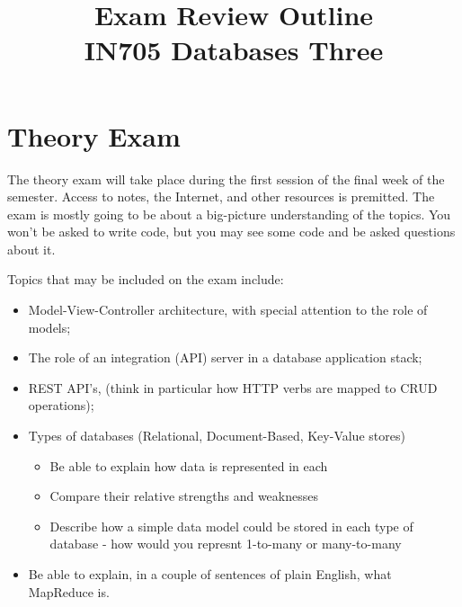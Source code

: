 \documentclass{article}
\begin{document}
\title{Exam Review Outline\\ IN705 Databases Three}
\date{}
\maketitle

\section*{Theory Exam}
The theory exam will take place during the first session of the final week of the semester. Access to notes, the Internet, and other resources is premitted. 
The exam is mostly going to be about a big-picture understanding of the topics.  You won't be asked to write code, but you may see some code and be asked questions
about it.

Topics that may be included on the exam include:

\begin{itemize}
	\item Model-View-Controller architecture, with special attention to the role of models;
	\item The role of an integration (API) server in a database application stack;
	\item REST API's, (think in particular how HTTP verbs are mapped to CRUD operations);
	\item Types of databases (Relational, Document-Based, Key-Value stores)
		\begin{itemize}
		\item Be able to explain how data is represented in each
		\item Compare their relative strengths and weaknesses
		\item Describe how a simple data model could be stored in each type of database - how would you represnt 1-to-many or many-to-many
	\end{itemize}
        \item Be able to explain, in a couple of sentences of plain English, what MapReduce is.
\end{itemize}
\end{document}
